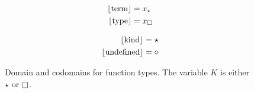 
\begin{figure}
    \centering
    \begin{minipage}{0.5\textwidth}
        \begin{align*}
            \lfloor \!\!~\textnormal{term} \rfloor &= x_\star \\
            \lfloor \!\!~\textnormal{type} \rfloor &= x_\square
        \end{align*}
    \end{minipage}%
    \begin{minipage}{0.5\textwidth}
        \begin{align*}
            \lfloor \!\!~\textnormal{kind} \rfloor &= \star \\
            \lfloor \text{undefined} \rfloor &= \diamond
        \end{align*}
    \end{minipage}
    \caption{Domain and codomains for function types. The variable $K$ is either $\star$ or $\kind$.}
\end{figure}


